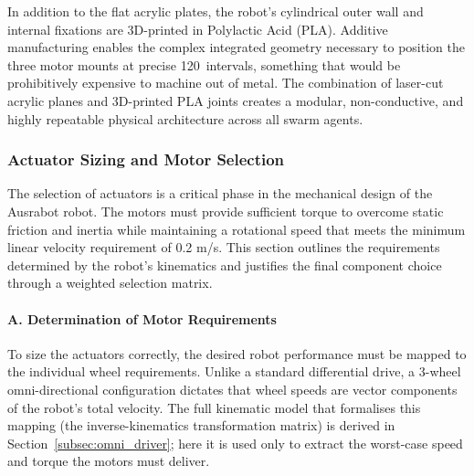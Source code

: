 In addition to the flat acrylic plates, the robot's cylindrical outer wall and internal fixations are 3D-printed in Polylactic Acid (PLA). Additive manufacturing enables the complex integrated geometry necessary to position the three motor mounts at precise 120\degree\ intervals, something that would be prohibitively expensive to machine out of metal. The combination of laser-cut acrylic planes and 3D-printed PLA joints creates a modular, non-conductive, and highly repeatable physical architecture across all swarm agents.


\newpage

\subsubsection{Actuator Sizing and Motor Selection}
The selection of actuators is a critical phase in the mechanical design of the Ausrabot robot. The motors must provide sufficient torque to overcome static friction and inertia while maintaining a rotational speed that meets the minimum linear velocity requirement of 0.2 m/s. This section outlines the requirements determined by the robot's kinematics and justifies the final component choice through a weighted selection matrix.

\paragraph{A. Determination of Motor Requirements}
To size the actuators correctly, the desired robot performance must be mapped to the individual wheel requirements. Unlike a standard differential drive, a 3-wheel omni-directional configuration dictates that wheel speeds are vector components of the robot's total velocity. The full kinematic model that formalises this mapping (the inverse-kinematics transformation matrix) is derived in Section~\ref{subsec:omni_driver}; here it is used only to extract the worst-case speed and torque the motors must deliver.

